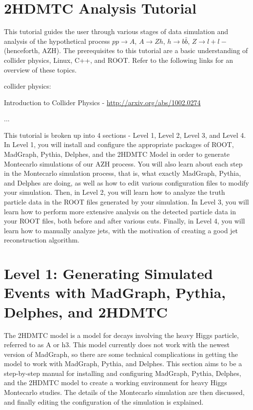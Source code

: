 \documentclass{article}
\begin{document}
\section*{2HDMTC Analysis Tutorial}

This tutorial guides the user through various stages of data simulation and analysis of the hypothetical process $p p \rightarrow{} A$, $A \rightarrow{} Z h$, $h \rightarrow{} b \bar{b}$, $Z \rightarrow{} l+ l-$ (henceforth, AZH). The prerequisites to this tutorial are a basic understanding of collider physics, Linux, C++, and ROOT. Refer to the following links for an overview of these topics.

\bigskip

collider physics:

Introduction to Collider Physics - \url{http://arxiv.org/abs/1002.0274}

...

\bigskip

This tutorial is broken up into 4 sections - Level 1, Level 2, Level 3, and Level 4. In Level 1, you will install and configure the appropriate packages of ROOT, MadGraph, Pythia, Delphes, and the 2HDMTC Model in order to generate Montecarlo simulations of our AZH process. You will also learn about each step in the Montecarlo simulation process, that is, what exactly MadGraph, Pythia, and Delphes are doing, as well as how to edit various configuration files to modify your simulation. Then, in Level 2, you will learn how to analyze the truth particle data in the ROOT files generated by your simulation. In Level 3, you will learn how to perform more extensive analysis on the detected particle data in your ROOT files, both before and after various cuts. Finally, in Level 4, you will learn how to manually analyze jets, with the motivation of creating a good jet reconstruction algorithm.

\section{Level 1: Generating Simulated Events with MadGraph, Pythia, Delphes, and 2HDMTC}

The 2HDMTC model is a model for decays involving the heavy Higgs particle, referred to as A or h3. This model currently does not work with the newest version of MadGraph, so there are some technical complications in getting the model to work with MadGraph, Pythia, and Delphes. This section aims to be a step-by-step manual for installing and configuring MadGraph, Pythia, Delphes, and the 2HDMTC model to create a working environment for heavy Higgs Montecarlo studies. The details of the Montecarlo simulation are then discussed, and finally editing the configuration of the simulation is explained.
\end{document}
